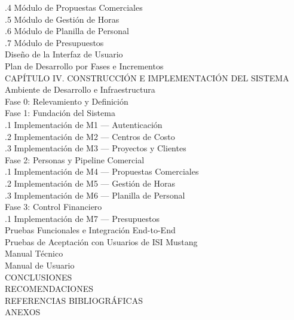 \documentclass{univalle-perfil}
\begin{document}
\begin{indicetentativo}
\quad{}.4 Módulo de Propuestas Comerciales \\
\quad{}.5 Módulo de Gestión de Horas \\
\quad{}.6 Módulo de Planilla de Personal \\
\quad{}.7 Módulo de Presupuestos \\
 Diseño de la Interfaz de Usuario \\
 Plan de Desarrollo por Fases e Incrementos \\[2pt]
CAPÍTULO IV. CONSTRUCCIÓN E IMPLEMENTACIÓN DEL SISTEMA \\
 Ambiente de Desarrollo e Infraestructura \\
 Fase 0: Relevamiento y Definición \\
 Fase 1: Fundación del Sistema \\
\quad{}.1 Implementación de M1 — Autenticación \\
\quad{}.2 Implementación de M2 — Centros de Costo \\
\quad{}.3 Implementación de M3 — Proyectos y Clientes \\
 Fase 2: Personas y Pipeline Comercial \\
\quad{}.1 Implementación de M4 — Propuestas Comerciales \\
\quad{}.2 Implementación de M5 — Gestión de Horas \\
\quad{}.3 Implementación de M6 — Planilla de Personal \\
 Fase 3: Control Financiero \\
\quad{}.1 Implementación de M7 — Presupuestos \\
 Pruebas Funcionales e Integración End-to-End \\
 Pruebas de Aceptación con Usuarios de ISI Mustang \\
 Manual Técnico \\
 Manual de Usuario \\[2pt]
CONCLUSIONES \\
RECOMENDACIONES \\
REFERENCIAS BIBLIOGRÁFICAS \\
ANEXOS
\end{indicetentativo}

\end{document}
